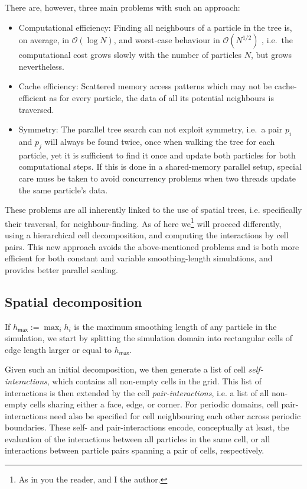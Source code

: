 \documentclass[final]{siamltex}
\newcommand{\oh}[1]
    {\mbox{$ {\mathcal O}( #1 ) $}}
\begin{document}
There are, however, three main problems with such an approach:
\begin{itemize}
    \item Computational efficiency: Finding all neighbours
        of a particle in the tree is, on average, in \oh{\log N},
        and worst-case behaviour in \oh{N^{1/2}} \cite{ref:Lee1977},
        i.e.~the computational cost grows slowly with the number
        of particles $N$, but grows nevertheless.
    \item Cache efficiency: Scattered memory access patterns
        which may not be cache-efficient as for every particle,
        the data of all its potential neighbours is traversed.
    \item Symmetry: The parallel tree search can not exploit symmetry,
        i.e.~a pair $p_i$ and $p_j$ will always be found twice,
        once when walking the tree for each particle, yet it is
        sufficient to find it once and update both particles for
        both computational steps.
        If this is done in a shared-memory parallel setup, special
        care muss be taken to avoid concurrency problems when
        two threads update the same particle's data.
\end{itemize}
    
These problems are all inherently linked to the use of
spatial trees, i.e. specifically their traversal,
for neighbour-finding.
As of here we\footnote{As in you the reader, and I the author.}
will proceed differently, using a hierarchical cell
decomposition, and computing the interactions by cell pairs.
This new approach avoids the above-mentioned problems and
is both more efficient for both constant and variable smoothing-length
simulations, and provides better parallel scaling.


\subsection{Spatial decomposition}

If $h_\mathsf{max} := \max_i  h_i $ is the maximum smoothing
length of any particle in the simulation, we start by splitting
the simulation domain into rectangular cells of edge length
larger or equal to $h_\mathsf{max}$.

Given such an initial decomposition, we then generate
a list of cell {\em self-interactions}, which contains all
non-empty cells in the grid.
This list of interactions is then extended by the cell
{\em pair-interactions}, i.e. a list of all non-empty cells
sharing either a face, edge, or corner.
For periodic domains, cell pair-interactions need also be
specified for cell neighbouring each other across
periodic boundaries.
These self- and pair-interactions encode, conceptually at least,
the evaluation of the interactions between all particles
in the same cell, or all interactions between particle pairs
spanning a pair of cells, respectively.
\end{document}
